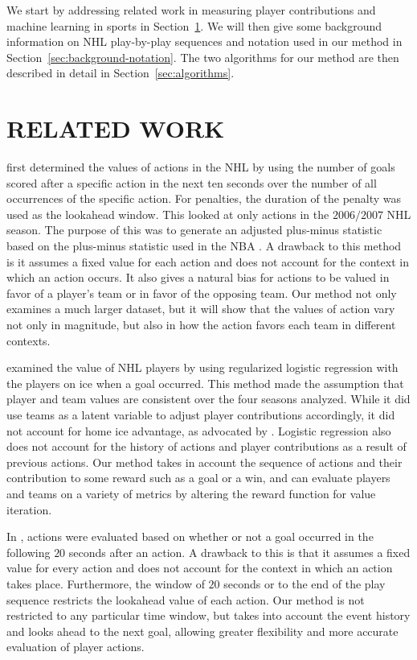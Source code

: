 \documentclass[]{article}
\begin{document}
We start by addressing related work in measuring player contributions and machine learning in sports in Section~\ref{sec:related-work}. We will then give some background information on NHL play-by-play sequences and notation used in our method in Section~\ref{sec:background-notation}. The two algorithms for our method are then described in detail in Section~\ref{sec:algorithms}.


\section{RELATED WORK}
\label{sec:related-work}

\citep{Lock2009} first determined the values of actions in the NHL by using the number of goals scored after a specific action in the next ten seconds over the number of all occurrences of the specific action. For penalties, the duration of the penalty was used as the lookahead window. This looked at only actions in the $2006/2007$ NHL season. The purpose of this was to generate an adjusted plus-minus statistic based on the plus-minus statistic used in the NBA \citep{Rosenbaum2004}. A drawback to this method is it assumes a fixed value for each action and does not account for the context in which an action occurs. It also gives a natural bias for actions to be valued in favor of a player's team or in favor of the opposing team. Our method not only examines a much larger dataset, but it will show that the values of action vary not only in magnitude, but also in how the action favors each team in different contexts.

\citep{Gramacy2013} examined the value of NHL players by using regularized logistic regression with the players on ice when a goal occurred. This method made the assumption that player and team values are consistent over the four seasons analyzed. While it did use teams as a latent variable to adjust player contributions accordingly, it did not account for home ice advantage, as advocated by \citep{Schuckers2013}. Logistic regression also does not account for the history of actions and player contributions as a result of previous actions. Our method takes in account the sequence of actions and their contribution to some reward such as a goal or a win, and can evaluate players and teams on a variety of metrics by altering the reward function for value iteration.

In \citep{Schuckers2013}, actions were evaluated based on whether or not a goal occurred in the following $20$ seconds after an action. A drawback to this is that it assumes a fixed value for every action and does not account for the context in which an action takes place. Furthermore, the window of $20$ seconds or to the end of the play sequence restricts the lookahead value of each action. Our method is not restricted to any particular time window, but takes into account the event history and looks ahead to the next goal, allowing greater flexibility and more accurate evaluation of player actions.
\end{document}
